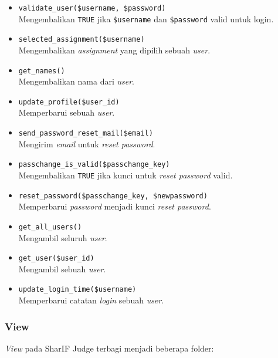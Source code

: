 \begin{itemize}
\begin{itemize}
	    \item \verb|validate_user($username, $password)| \\ Mengembalikan \verb|TRUE| jika \verb|$username| dan \verb|$password| valid untuk login.
	    \item \verb|selected_assignment($username)| \\ Mengembalikan \textit{assignment} yang dipilih sebuah \textit{user}.
	    \item \verb|get_names()| \\  Mengembalikan nama dari \textit{user}.
	    \item \verb|update_profile($user_id)| \\ Memperbarui sebuah \textit{user}.
	    \item \verb|send_password_reset_mail($email)| \\ Mengirim \textit{email} untuk \textit{reset password}.
	    \item \verb|passchange_is_valid($passchange_key)| \\ Mengembalikan \verb|TRUE| jika kunci untuk \textit{reset password} valid.
	    \item \verb|reset_password($passchange_key, $newpassword)| \\ Memperbarui \textit{password} menjadi kunci \textit{reset password}.
	    \item \verb|get_all_users()| \\ Mengambil seluruh \textit{user}.
	    \item \verb|get_user($user_id)| \\ Mengambil sebuah \textit{user}.
	    \item \verb|update_login_time($username)| \\ Memperbarui catatan \textit{login} sebuah \textit{user}.
	\end{itemize}
\end{itemize}

\subsubsection{View}

\textit{View} pada SharIF Judge terbagi menjadi beberapa folder:


